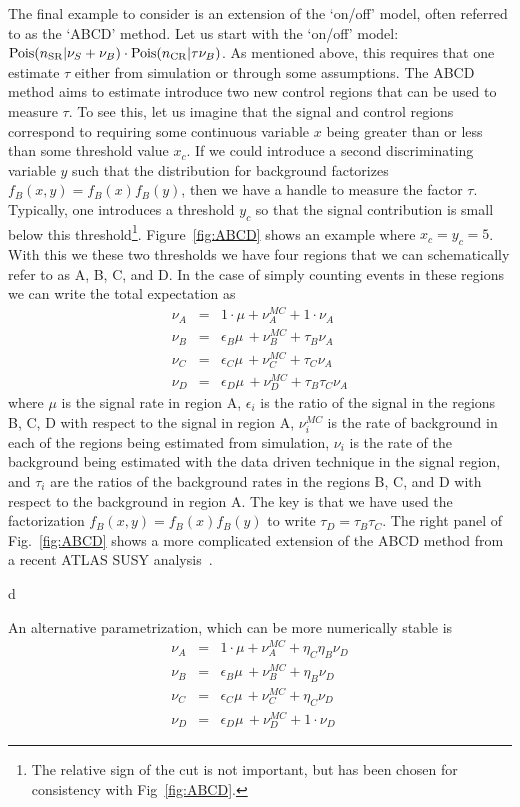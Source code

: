 \documentclass{cernrep}
\newcommand{\Pois}{{\ensuremath{\rm Pois}}}
\begin{document}
The final example to consider is an extension of the `on/off' model, often referred to as the `ABCD' method.  Let us start with the `on/off' model:
\mbox{ $\Pois(n_{\rm SR} | \nu_S + \nu_B)\cdot \Pois(n_{\rm CR}|\tau\nu_B)$}.  As mentioned above, this requires that one estimate $\tau$ either from simulation or through some assumptions. The ABCD method aims to estimate introduce two new control regions that can be used to measure  $\tau$.  To see this, let us imagine that the signal and control regions correspond to requiring some continuous variable $x$ being greater than or less than some threshold value $x_c$.  If we could introduce a second discriminating variable $y$ such that the distribution for background factorizes $f_B(x,y)=f_B(x)f_B(y)$, then we have a handle to measure the factor $\tau$.  Typically, one introduces a threshold $y_c$  so that the signal contribution is small below this threshold\footnote{The relative sign of the cut is not important, but has been chosen for consistency with Fig~\ref{fig:ABCD}.}.  Figure~\ref{fig:ABCD} shows an example where $x_c=y_c=5$.  With this we these two thresholds we have four regions that we can schematically refer to as A, B, C, and D.  In the case of simply counting events in these regions we can write the total expectation as
\begin{eqnarray}
\nu_A &=& 1\cdot\mu + \nu_A^{MC} + 1\cdot\nu_A \\\nonumber
\nu_B &=& \epsilon_B\mu \,+ \nu_B^{MC} + \tau_B\nu_A \\\nonumber
\nu_C &=& \epsilon_C\mu \,+ \nu_C^{MC} + \tau_C\nu_A \\\nonumber
\nu_D &=& \epsilon_D\mu \,+ \nu_D^{MC} + \tau_B\tau_C\nu_A 
\end{eqnarray}
where $\mu$ is the signal rate in region A, $\epsilon_i$ is the ratio of the signal in the regions B, C, D with respect to the signal in region A, $\nu_i^{MC}$ is the rate of background in each of the regions being estimated from simulation,  $\nu_i$ is the rate of the background being estimated with the data driven technique in the signal region, and $\tau_i$ are the ratios of the background rates in the regions B, C, and D with respect to the background in region A.  The key is that we have used the factorization $f_B(x,y)=f_B(x)f_B(y)$ to write $\tau_D=\tau_B\tau_C$.  The right panel of Fig.~\ref{fig:ABCD} shows a more complicated extension of the ABCD method from a recent ATLAS SUSY analysis~\cite{ATLAS:2011ad}.

d

An alternative parametrization, which can be more numerically stable is\\
\begin{eqnarray}
\nu_A &=& 1\cdot\mu + \nu_A^{MC} + \eta_C\eta_B\nu_D \\\nonumber
\nu_B &=& \epsilon_B\mu \,+ \nu_B^{MC} + \eta_B\nu_D \\\nonumber
\nu_C &=& \epsilon_C\mu \,+ \nu_C^{MC} + \eta_C\nu_D \\\nonumber
\nu_D &=& \epsilon_D\mu \,+ \nu_D^{MC} + 1\cdot\nu_D 
\end{eqnarray}
\end{document}
